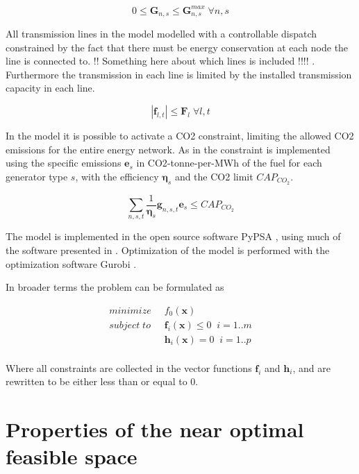 \begin{equation}
0 \leq \mathbf{G}_{n,s} \leq \mathbf{G}_{n,s}^{max} \; \forall n,s
\end{equation}

All transmission lines in the model modelled with a controllable dispatch constrained by the fact that there must be energy conservation at each node the line is connected to. !! Something here about which lines is included !!!! . Furthermore the transmission in each line is limited by the installed transmission capacity in each line. 

\begin{equation}
|\mathbf{f}_{l,t}| \leq \mathbf{F}_l \; \forall l,t
\end{equation}

In the model it is possible to activate a CO2 constraint, limiting the allowed CO2 emissions for the entire energy network. As in \cite{PyPSA_euro_30_model} the constraint is implemented using the specific emissions $\mathbf{e}_s$ in CO2-tonne-per-MWh of the fuel for each generator type $s$, with the efficiency $\mathbf{\eta}_s$ and the CO2 limit $CAP_{CO_2}$. 

\begin{equation}
\sum_{n,s,t} \frac{1}{\mathbf{\eta}_s}\mathbf{g}_{n,s,t} \mathbf{e}_s \leq CAP_{CO_2}
\end{equation}

The model is implemented in the open source software PyPSA \cite{Pypsa}, using much of the software presented in \cite{PyPSA_euro_30_model}. Optimization of the model is performed with the optimization software Gurobi \cite{Gurobi}. 

In broader terms the problem can be formulated as 

\begin{equation}
	\begin{split}
	minimize \;&\; f_0(\mathbf{x})   \; \\
	subject \; to \; &\; \mathbf{f}_i(\mathbf{x}) \leq 0 \; \; i=1..m\\
		\;			&\;  \mathbf{h}_i(\mathbf{x}) = 0 \; \; i=1..p\\
	\end{split}
\end{equation}

Where all constraints are collected in the vector functions  $\mathbf{f}_i$ and $\mathbf{h}_i$, and are rewritten to be either less than or equal to $0$. 

\section{Properties of the near optimal feasible space}\label{sec:properties_of_hull}

